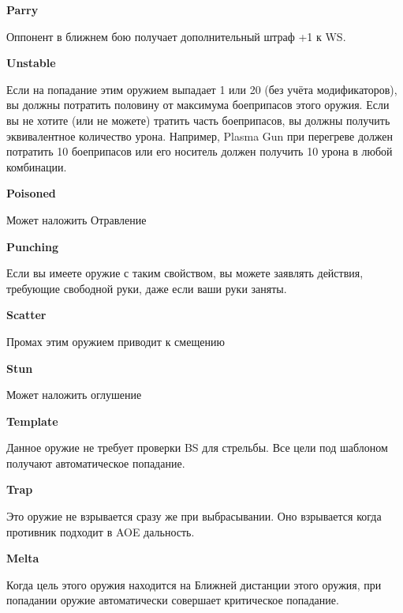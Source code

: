 \begin{multicols}{2}
\textbf{Parry}

Оппонент в ближнем бою получает дополнительный штраф +1 к WS.

\textbf{Unstable}

Если на попадание этим оружием выпадает 1 или 20 (без учёта модификаторов), вы должны потратить половину от максимума боеприпасов этого оружия.
Если вы не хотите (или не можете) тратить часть боеприпасов, вы должны получить эквивалентное количество урона.
Например, Plasma Gun при перегреве должен потратить 10 боеприпасов или его носитель должен получить 10 урона в любой комбинации.

\textbf{Poisoned}

Может наложить Отравление

\textbf{Punching}

Если вы имеете оружие с таким свойством, вы можете заявлять действия, требующие свободной руки, даже если ваши руки заняты.

\textbf{Scatter}

Промах этим оружием приводит к смещению

\textbf{Stun}

Может наложить оглушение

\textbf{Template}

Данное оружие не требует проверки BS для стрельбы. Все цели под шаблоном получают автоматическое попадание.

\textbf{Trap}

Это оружие не взрывается сразу же при выбрасывании. Оно взрывается когда противник подходит в AOE дальность.

\textbf{Melta}

Когда цель этого оружия находится на Ближней дистанции этого оружия, при попадании оружие автоматически совершает критическое попадание.

\end{multicols}